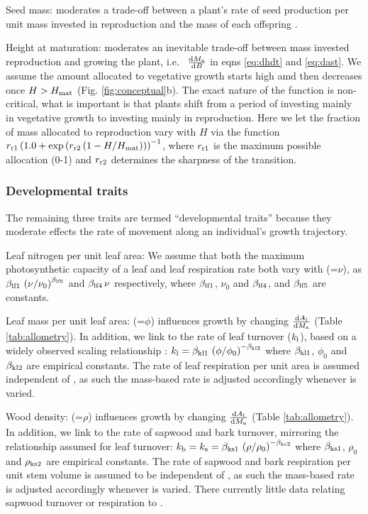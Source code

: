 \documentclass[9pt,twocolumn,twoside,lineno]{pnas-new}
\begin{document}
Seed mass: {\seed} moderates a trade-off between a plant's rate of seed production per unit mass invested in reproduction and the mass of each offspring  \citep{Moles-2006}.

Height at maturation: {\hmat} moderates an inevitable trade-off between mass invested reproduction and growing the plant, i.e.~ $\frac{{\rm d}M_{\rm a}}{{\rm d}B}$ in eqns \ref{eq:dhdt} and \ref{eq:dast}. We assume the amount allocated to vegetative growth starts high amd then decreases once $H > H_{{\rm mat}}$  (Fig. \ref{fig:conceptual}b). The exact nature of the function is non-critical, what is important is that plants shift from a period of investing mainly in vegetative growth to investing mainly in reproduction. Here we let the fraction of mass allocated to reproduction vary with $H$ via the function $r_{\rm r1}  \left(1.0 + \exp\left(r_{\rm r2} \left(1 - H / H_{{\rm mat}}\right)\right)\right)^{-1}$, where $r_{\rm r1}$ is the maximum possible allocation (0-1) and $r_{\rm r2}$ determines the sharpness of the transition. 

\subsubsection{Developmental traits} The remaining three traits are termed ``developmental traits'' because they moderate effects the rate of movement along an individual's growth trajectory. 

Leaf nitrogen per unit leaf area: We assume that both the maximum photosynthetic capacity of a leaf and leaf respiration rate both vary with {\nitrogen} (=$\nu$), as $\beta_{{\rm lf1}} \, \left(\nu / \nu_0 \right)^{\beta_{{\rm lf5}}}$ and $\beta_{{\rm lf4}}\, \nu$ respectively, where $\beta_{{\rm lf1}}$, $\nu_0$ and $\beta_{{\rm lf4}}$, and $\beta_{{\rm lf5}}$ are constants.

Leaf mass per unit leaf area: {\lma} (=$\phi$) influences growth by changing $\frac{{\rm d}A_{\rm l}}{{\rm d}M_{\rm a}}$ (Table \ref{tab:allometry}). In addition, we link {\lma} to the rate of leaf turnover ($k_{\rm l}$), based on a widely observed scaling relationship \citep{Wright-2004}: $k_{\rm l} = \beta_{{\rm kl1}} \, \left(\phi/\phi_0\right)^{-\beta_{{\rm kl2}}}$ where $\beta_{{\rm kl1}}$, $\phi_0$ and $\beta_{{\rm kl2}}$ are empirical constants. The rate of leaf respiration per unit area is assumed independent of {\lma}\citep{Wright-2004}, as such the mass-based rate is adjusted accordingly whenever {\lma} is varied.

Wood density: {\wood} (=$\rho$) influences growth by changing $\frac{{\rm d}A_{\rm l}}{{\rm d}M_{\rm a}}$ (Table \ref{tab:allometry}). In addition, we link {\wood} to the rate of sapwood and bark turnover, mirroring the relationship assumed for leaf turnover: $k_{\rm b} = k_{\rm s} = \beta_{{\rm ks1}} \, \left(\rho / \rho_0\right)^{-\beta_{{\rm ks2}}}$ where $\beta_{{\rm ks1}}$, $\rho_0$ and $\rho_{{\rm ks2}}$ are empirical constants. The rate of sapwood and bark respiration per unit stem volume is assumed to be independent of {\wood}, as such the mass-based rate is adjusted accordingly whenever {\wood} is varied. There currently little data relating sapwood turnover or respiration to {\wood}.
\end{document}
